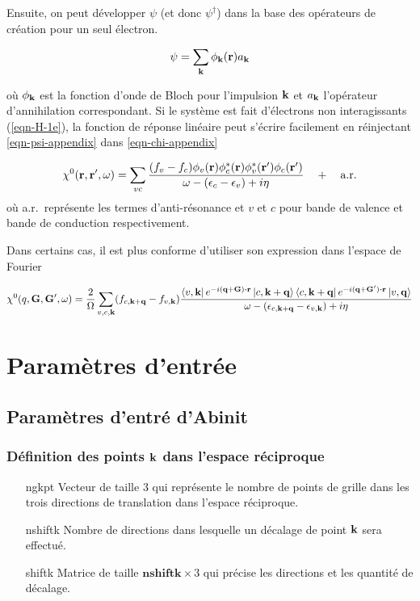Ensuite, on peut développer $\psi$ (et donc $\psi^\dagger$)
dans la base des opérateurs de création pour un seul électron.

\begin{equation}\label{eqn-psi-appendix}
  \psi = \sum_{\vb{k}} \phi_{\vb{k}}(\vb{r}) a_{\vb{k}}
\end{equation}

où $\phi_{\vb{k}}$ est la fonction d'onde de Bloch pour l'impulsion $\vb{k}$
et $a_{\vb{k}}$ l'opérateur d'annihilation correspondant.
Si le système est fait d'électrons non interagissants (\cref{eqn-H-1e}),
la fonction de réponse linéaire peut s'écrire facilement en réinjectant \cref{eqn-psi-appendix} dans \cref{eqn-chi-appendix} 

\begin{equation}\label{eqn-chi}
  \chi^0(\vb{r}, \vb{r}', \omega) = \sum_{vc} \frac{(f_v - f_c)\phi_v(\vb{r}) \phi_c^*(\vb{r}) \phi_v^*(\vb{r}') \phi_c(\vb{r}')}{\omega - (\epsilon_c - \epsilon_v) + i\eta} \quad + \quad \text{a.r.}
\end{equation}
où a.r.\ représente les termes d'anti-résonance et $v$ et $c$
pour bande de valence et bande de conduction respectivement.

Dans certains cas, il est plus conforme d'utiliser son expression dans l'espace de Fourier

\begin{equation}\label{eqn-chi_q}
  \chi^0(q, \vb{G}, \vb{G}', \omega) = \frac{2}{\Omega}\sum_{v,c,\vb{k}}(f_{c,\vb{k}+\vb{q}} - f_{v,\vb{k}}) \frac{\bra{v, \vb{k}}e^{-i(\vb{q}+\vb{G})\vdot\vb{r}} \ket{c , \vb{k}+\vb{q}}\bra{c, \vb{k}+\vb{q}} e^{-i(\vb{q}+\vb{G}')\vdot\vb{r}} \ket{v , \vb{q}}}{\omega - (\epsilon_{c, \vb{k}+\vb{q}} - \epsilon_{v,\vb{k}}) + i\eta}
\end{equation}

\chapter{Paramètres d'entrée}
\section{Paramètres d'entré d'Abinit}
\subsection{Définition des points $\vb{k}$ dans l'espace réciproque}
\begin{itemize}[labelwidth=, leftmargin=+, font=\bfseries]
  \item[ngkpt] Vecteur de taille 3 qui représente le nombre de points de grille dans les trois directions de translation dans l'espace réciproque.
  \item[nshiftk] Nombre de directions dans lesquelle un décalage de point $\vb{k}$ sera effectué.
  \item[shiftk] Matrice de taille $\textbf{nshiftk}\times 3$ qui précise les directions et les quantité de décalage.
\end{itemize}
